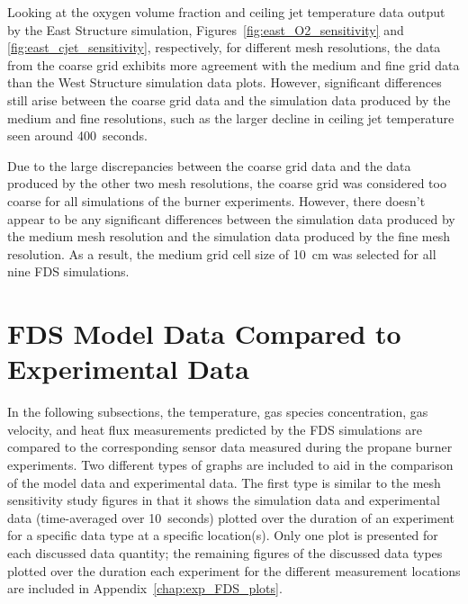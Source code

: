 Looking at the oxygen volume fraction and ceiling jet temperature data output by the East Structure simulation, Figures~\ref{fig:east_O2_sensitivity} and \ref{fig:east_cjet_sensitivity}, respectively, for different mesh resolutions, the data from the coarse grid exhibits more agreement with the medium and fine grid data than the West Structure simulation data plots. However, significant differences still arise between the coarse grid data and the simulation data produced by the medium and fine resolutions, such as the larger decline in ceiling jet temperature seen around 400~seconds.   

Due to the large discrepancies between the coarse grid data and the data produced by the other two mesh resolutions, the coarse grid was considered too coarse for all simulations of the burner experiments. However, there doesn't appear to be any significant differences between the simulation data produced by the medium mesh resolution and the simulation data produced by the fine mesh resolution. As a result, the medium grid cell size of 10~cm was selected for all nine FDS simulations.

\section{FDS Model Data Compared to Experimental Data}
In the following subsections, the temperature, gas species concentration, gas velocity, and heat flux measurements predicted by the FDS simulations are compared to the corresponding sensor data measured during the propane burner experiments. Two different types of graphs are included to aid in the comparison of the model data and experimental data. The first type is similar to the mesh sensitivity study figures in that it shows the simulation data and experimental data (time-averaged over 10~seconds) plotted over the duration of an experiment for a specific data type at a specific location(s). Only one plot is presented for each discussed data quantity; the remaining figures of the discussed data types plotted over the duration each experiment for the different measurement locations are included in Appendix~\ref{chap:exp_FDS_plots}.

